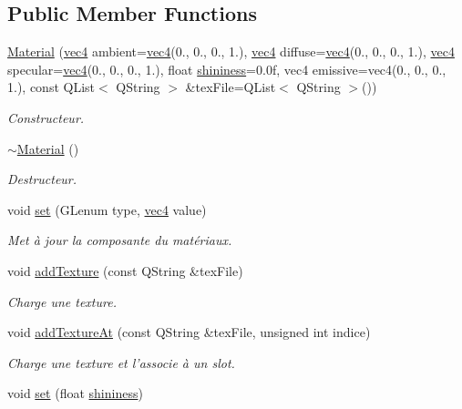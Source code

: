 \subsection*{Public Member Functions}
\begin{DoxyCompactItemize}
\item 
\hyperlink{class_material_a93afc9b0f0a6ce06f294fa6b33b2e85c}{Material} (\hyperlink{structvec4}{vec4} ambient=\hyperlink{structvec4}{vec4}(0., 0., 0., 1.), \hyperlink{structvec4}{vec4} diffuse=\hyperlink{structvec4}{vec4}(0., 0., 0., 1.), \hyperlink{structvec4}{vec4} specular=\hyperlink{structvec4}{vec4}(0., 0., 0., 1.), float \hyperlink{class_material_a9a938aa96f0d5a5dc4d17d43cfd4b42b}{shininess}=0.\+0f, vec4 emissive=vec4(0., 0., 0., 1.), const Q\+List$<$ Q\+String $>$ \&tex\+File=\+Q\+List$<$ Q\+String $>$())
\begin{DoxyCompactList}\small\item\em Constructeur. \end{DoxyCompactList}\item 
\hyperlink{class_material_a2c19452d71f54075df8f5405b03129f4}{$\sim$\+Material} ()
\begin{DoxyCompactList}\small\item\em Destructeur. \end{DoxyCompactList}\item 
void \hyperlink{class_material_a2ab92e03d9c90294cd28fff9b6a8cde0}{set} (G\+Lenum type, \hyperlink{structvec4}{vec4} value)
\begin{DoxyCompactList}\small\item\em Met à jour la composante du matériaux. \end{DoxyCompactList}\item 
void \hyperlink{class_material_aa51a12a59906542a7e66ff1d62547ad5}{add\+Texture} (const Q\+String \&tex\+File)
\begin{DoxyCompactList}\small\item\em Charge une texture. \end{DoxyCompactList}\item 
void \hyperlink{class_material_ae94ef957c20e02555a2e870f38aea904}{add\+Texture\+At} (const Q\+String \&tex\+File, unsigned int indice)
\begin{DoxyCompactList}\small\item\em Charge une texture et l'associe à un slot. \end{DoxyCompactList}\item 
void \hyperlink{class_material_a3de47a95f13dc6f6306493516814762c}{set} (float \hyperlink{class_material_a9a938aa96f0d5a5dc4d17d43cfd4b42b}{shininess})

\end{DoxyCompactItemize}
